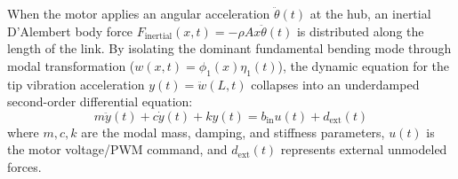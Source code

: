\documentclass[conference]{IEEEtran}
\begin{document}
When the motor applies an angular acceleration $\ddot{\theta}(t)$ at the hub, an inertial D'Alembert body force $F_{\text{inertial}}(x,t) = -\rho A x \ddot{\theta}(t)$ is distributed along the length of the link. By isolating the dominant fundamental bending mode through modal transformation ($w(x,t) = \phi_1(x) \eta_1(t)$), the dynamic equation for the tip vibration acceleration $y(t) = \ddot{w}(L,t)$ collapses into an underdamped second-order differential equation:
\begin{equation}
m \ddot{y}(t) + c \dot{y}(t) + k y(t) = b_{\text{in}} u(t) + d_{\text{ext}}(t)
\label{eq:ode}
\end{equation}
where $m, c, k$ are the modal mass, damping, and stiffness parameters, $u(t)$ is the motor voltage/PWM command, and $d_{\text{ext}}(t)$ represents external unmodeled forces.
\end{document}
